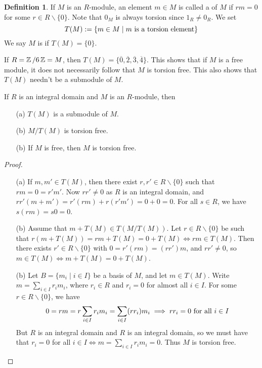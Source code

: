 \documentclass[11pt]{book}
\theoremstyle{definition}   \newtheorem{defn}[counter]{Definition} %
\newcommand{\ov}{\overline}   \newcommand{\wt}{\widetilde}
\newcommand{\bs}{\backslash}   \newcommand{\A}{\mathcal{A}}   \newcommand{\sy}{\textnormal{Syl}}   \newcommand{\size}[1]{\left| #1 \right|}
\newcommand{\vs}{\vspace{8pt}}
\numberwithin{counter}{chapter}
\begin{document}
\vs

\begin{defn}
If $M$ is an $R$-module, an element $m \in M$ is called a  of $M$ if $rm = 0$ for some $r \in R \bs \{0\}$. Note that $0_M$ is always torsion since $1_R \ne 0_R$. We set
	\[ T(M) := \{m \in M \mid m \textnormal{ is a torsion element} \} \]
We say $M$ is  if $T(M) = \{0\}$.
\end{defn}

\vs

\begin{example}
If $R = \operatorname{\mathbb{Z}}/6\operatorname{\mathbb{Z}} = M$, then $T(M) = \{\ov{0},\ov{2},\ov{3},\ov{4}\}$. This shows that if $M$ is a free module, it does not necessarily follow that $M$ is torsion free. This also shows that $T(M)$ needn't be a submodule of $M$.
\end{example}

\vs

\begin{lemma}
If $R$ is an integral domain and $M$ is an $R$-module, then
\begin{enumerate}
\item[(a)] $T(M)$ is a submodule of $M$.
\item[(b)] $M/T(M)$ is torsion free.
\item[(b)] If $M$ is free, then $M$ is torsion free.
\end{enumerate}
\end{lemma}

\vs

\begin{proof}\
\begin{enumerate}
\item[(a)] If $m,m' \in T(M)$, then there exist $r,r' \in R \bs \{0\}$ such that $rm = 0 = r'm'$. Now $rr' \ne 0$ as $R$ is an integral domain, and $rr'(m + m') = r'(rm) + r(r'm') = 0 + 0 = 0$. For all $s \in R$, we have $s(rm) = s 0 = 0$.

\item[(b)] Assume that $m + T(M) \in T(M/T(M))$. Let $r \in R \bs \{0\}$ be such that $r(m + T(M)) = rm + T(M) = 0 + T(M) \iff rm \in T(M)$. Then there exists $r' \in R \bs \{0\}$ with $0 = r'(rm) = (rr')m$, and $rr' \ne 0$, so $m \in T(M) \iff m + T(M) = 0 + T(M)$.

\item[(b)] Let $B = \{m_i \mid i \in I\}$ be a basis of $M$, and let $m \in T(M)$. Write $m = \sum_{i \in I} r_i m_i$, where $r_i \in R$ and $r_i = 0$ for almost all $i \in I$. For some $r \in R \bs \{0\}$, we have
	\[0 = rm = r \sum_{i \in I} r_i m_i = \sum_{i \in I} (rr_i) m_i \implies rr_i = 0 \textnormal{ for all } i \in I \]
But $R$ is an integral domain and $R$ is an integral domain, so we must have that $r_i = 0$ for all $i \in I \iff m = \sum_{i \in I} r_i m_i = 0$. Thus $M$ is torsion free.
\end{enumerate}
\end{proof}
\end{document}
